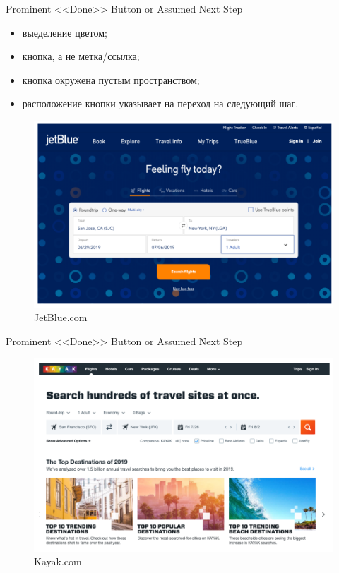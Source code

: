 \documentclass{beamer}
\begin{document}
\begin{frame}[t]{Prominent <<Done>> Button or Assumed Next Step}
	\begin{itemize}
		\item выеделение цветом;
		\item кнопка, а не метка/ссылка;		
		\item кнопка окружена пустым пространством;		
		\item расположение кнопки указывает на переход на следующий шаг.		
	\end{itemize}
	
	\begin{figure}[h]
		\centering
		\includegraphics[scale=0.6]{images/lec08-pic10.png}
		\caption{JetBlue.com}
	\end{figure}
\end{frame}

\begin{frame}[t]{Prominent <<Done>> Button or Assumed Next Step}
	\begin{figure}[h]
		\centering
		\includegraphics[scale=0.7]{images/lec08-pic11.png}
		\caption{Kayak.com}
	\end{figure}
\end{frame}
\end{document}
